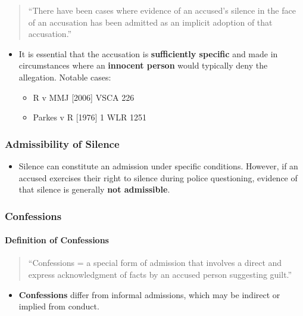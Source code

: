 \begin{quote}
``There have been cases where evidence of an accused's silence in the
face of an accusation has been admitted as an implicit adoption of that
accusation.''
\end{quote}

\begin{itemize}
\tightlist
\item
  It is essential that the accusation is \textbf{sufficiently specific}
  and made in circumstances where an \textbf{innocent person} would
  typically deny the allegation. Notable cases:

  \begin{itemize}
  \tightlist
  \item
    R v MMJ {[}2006{]} VSCA 226
  \item
    Parkes v R {[}1976{]} 1 WLR 1251
  \end{itemize}
\end{itemize}

\subsubsection{Admissibility of Silence}\label{admissibility-of-silence}

\begin{itemize}
\tightlist
\item
  Silence can constitute an admission under specific conditions.
  However, if an accused exercises their right to silence during police
  questioning, evidence of that silence is generally \textbf{not
  admissible}.
\end{itemize}

\subsubsection{Confessions}\label{confessions}

\paragraph{Definition of Confessions}\label{definition-of-confessions}

\begin{quote}
``Confessions = a special form of admission that involves a direct and
express acknowledgment of facts by an accused person suggesting guilt.''
\end{quote}

\begin{itemize}
\tightlist
\item
  \textbf{Confessions} differ from informal admissions, which may be
  indirect or implied from conduct.
\end{itemize}

